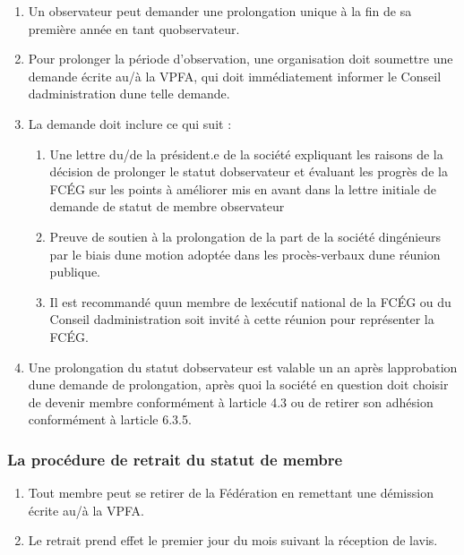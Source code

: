 \begin{enumerate}
 \item
  Un observateur peut demander une prolongation unique à la fin de sa première année en tant qu\textquotesingle observateur.
 \item
  Pour prolonger la période d'observation, une organisation doit soumettre une demande écrite au/à la VPFA, qui doit immédiatement informer le Conseil d\textquotesingle administration d\textquotesingle une telle demande.
 \item
  La demande doit inclure ce qui suit :

  \begin{enumerate}
   \item
    Une lettre du/de la président.e de la société expliquant les raisons de la décision de prolonger le statut d\textquotesingle observateur et évaluant les progrès de la FCÉG sur les points à améliorer mis en avant dans la lettre initiale de demande de statut de membre observateur
   \item
    Preuve de soutien à la prolongation de la part de la société d\textquotesingle ingénieurs par le biais d\textquotesingle une motion adoptée dans les procès-verbaux d\textquotesingle une réunion publique.
   \item
    Il est recommandé qu\textquotesingle un membre de l\textquotesingle exécutif national de la FCÉG ou du Conseil d\textquotesingle administration soit invité à cette réunion pour représenter la FCÉG.
  \end{enumerate}
 \item
  Une prolongation du statut d\textquotesingle observateur est valable un an après l\textquotesingle approbation d\textquotesingle une demande de prolongation, après quoi la société en question doit choisir de devenir membre conformément à l\textquotesingle article 4.3 ou de retirer son adhésion conformément à l\textquotesingle article 6.3.5.
\end{enumerate}

\subsubsection{La procédure de retrait du statut de membre}
\label{la-procedure-de-retrait-du-statut-de-membre}

\begin{enumerate}
 \item
  Tout membre peut se retirer de la Fédération en remettant une démission écrite au/à la VPFA.
 \item
  Le retrait prend effet le premier jour du mois suivant la réception de l\textquotesingle avis.
\end{enumerate}

